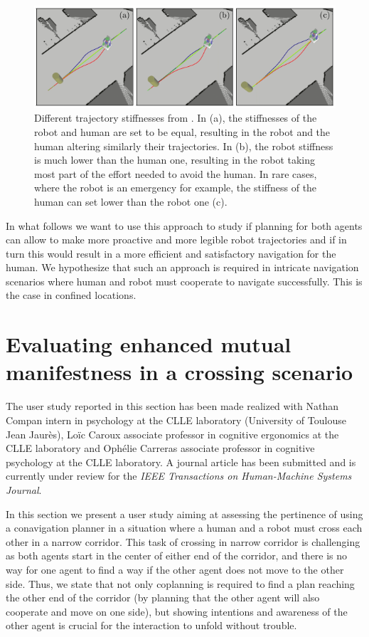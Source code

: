\documentclass[a4paper,11pt,twoside]{StyleThese}
\begin{document}
\begin{figure}[hbtp]
\centering
\includegraphics[width=\textwidth]{figures/chapter2/hateb_effort.png}
\caption{Different trajectory stiffnesses from \cite{khambhaita_viewing_2017}. In (a), the stiffnesses of the robot and human are set to be equal, resulting in the robot and the human altering similarly their trajectories. In (b), the robot stiffness is much lower than the human one, resulting in the robot taking most part of the effort needed to avoid the human. In rare cases, where the robot is an emergency for example, the stiffness of the human can set lower than the robot one (c).}
\label{fig:hateb_effort}
\end{figure}

In what follows we want to use this approach to study if planning for both agents can allow to make more proactive and more legible robot trajectories and if in turn this would result in a more efficient and satisfactory navigation for the human. We hypothesize that such an approach is required in intricate navigation scenarios where human and robot must cooperate to navigate successfully. This is the case in confined locations.

\section{Evaluating enhanced mutual manifestness in a crossing scenario}
The user study reported in this section has been made realized with Nathan Compan intern in psychology at the CLLE laboratory (University of Toulouse Jean Jaurès), Lo\"ic Caroux associate professor in cognitive ergonomics at the CLLE laboratory and Ophélie Carreras associate professor in cognitive psychology at the CLLE laboratory. A journal article has been submitted and is currently under review for the \textit{IEEE Transactions on Human-Machine Systems Journal}.

In this section we present a user study aiming at assessing the pertinence of using a conavigation planner in a situation where a human and a robot must cross each other in a narrow corridor. This task of crossing in narrow corridor is challenging as both agents start in the center of either end of the corridor, and there is no way for one agent to find a way if the other agent does not move to the other side. Thus, we state that not only coplanning is required to find a plan reaching the other end of the corridor (by planning that the other agent will also cooperate and move on one side), but showing intentions and awareness of the other agent is crucial for the interaction to unfold without trouble.
\end{document}
